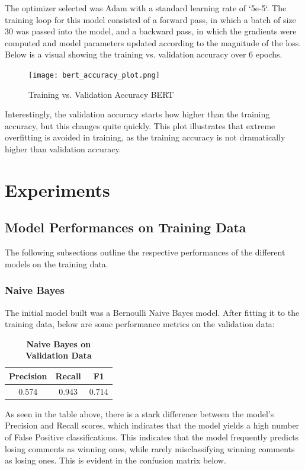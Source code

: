 \documentclass[twocolumn]{article}
\begin{document}
The optimizer selected was Adam with a standard learning rate of `5e-5`. The training loop for this model consisted of a forward pass, in which a batch of size 30 was passed into the model, and a backward pass, in which the gradients were computed and model parameters updated according to the magnitude of the loss. Below is a visual showing the training vs. validation accuracy over 6 epochs.

\begin{figure}[H]
    \centering
    \texttt{[image: bert\_accuracy\_plot.png]}
    \caption{Training vs. Validation Accuracy BERT}
\end{figure}

Interestingly, the validation accuracy starts how higher than the training accuracy, but this changes quite quickly. This plot illustrates that extreme overfitting is avoided in training, as the training accuracy is not dramatically higher than validation accuracy.

\section{Experiments}

\subsection{Model Performances on Training Data}

The following subsections outline the respective performances of the different models on the training data.

\subsubsection{Naive Bayes}
The initial model built was a Bernoulli Naive Bayes model. After fitting it to the training data, below are some performance metrics on the validation data:

\begin{table}[H]
\centering %
\caption{\textbf{Naive Bayes on Validation Data}} 

\begin{tabular}{ccc} 
\toprule
Precision & Recall & F1 \\ 
\midrule
0.574 & 0.943 & 0.714 \\
\bottomrule
\end{tabular}
\end{table}

As seen in the table above, there is a stark difference between the model's Precision and Recall scores, which indicates that the model yields a high number of False Positive classifications. This indicates that the model frequently predicts losing comments as winning ones, while rarely misclassifying winning comments as losing ones. This is evident in the confusion matrix below.
\end{document}
